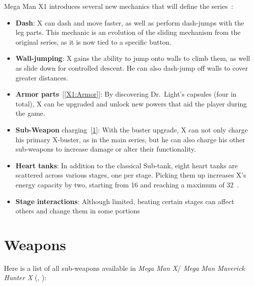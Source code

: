 Mega Man X1 introduces several new mechanics that will define the series~\cite{wiki:X1_features}:
\begin{itemize}
	
\item \textbf{Dash}: X can dash and move faster, as well as perform dash-jumps with the leg parts. This mechanic is an evolution of the sliding mechanism from the original series, as it is now tied to a specific button.

\item \textbf{Wall-jumping}: X gains the ability to jump onto walls to climb them, as well as slide down for controlled descent. He can also dash-jump off walls to cover greater distances.

\item \textbf{Armor parts}~[\ref{X1:Armor}]: By discovering Dr.~Light's capsules (four in total), X can be upgraded and unlock new powers that aid the player during the game.

\item \textbf{Sub-Weapon} charging~[\ref{X1:sub_weapon}]: With the buster upgrade, X can not only charge his primary X-buster, as in the main series, but he can also charge his other sub-weapons to increase damage or alter their functionality.

\item \textbf{Heart tanks}: In addition to the classical Sub-tank, eight heart tanks are scattered across various stages, one per stage. Picking them up increases X's energy capacity by two, starting from 16 and reaching a maximum of 32~\cite{stratwiki:Heart_tank}.

\item \textbf{Stage interactions}: Although limited, beating certain stages can affect others and change them in some portions
\end{itemize}

\section{Weapons}\label{X1:sub_weapon}
Here is a list of all sub-weapons available in\textit{ Mega Man X}/ \textit{Mega Man Maverick Hunter X} (\cite{MHX:manual}, \cite{wiki:X_weapons}):

